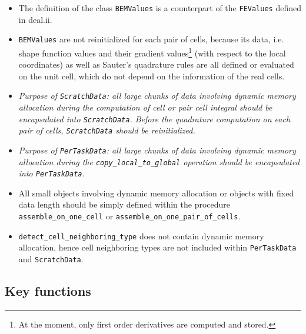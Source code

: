 \documentclass[11pt, a4paper]{article}
\begin{document}
\begin{itemize}
\item The definition of the class \texttt{BEMValues} is a counterpart of the \texttt{FEValues}
  defined in deal.ii.
\item \texttt{BEMValues} are not reinitialized for each pair of cells, because its data,
  i.e. shape function values and their gradient values\footnote{At the moment, only first
    order derivatives are computed and stored.} (with respect to the local
  coordinates) as well as Sauter's quadrature rules are all defined or evaluated on the
  unit cell, which do not depend on the information of the real cells.
\item \emph{Purpose of \texttt{ScratchData}: all large chunks of data involving dynamic memory
    allocation during the computation of cell or pair cell integral should be encapsulated into
    \texttt{ScratchData}. Before the quadrature computation on each pair of cells,
    \texttt{ScratchData} should be reinitialized.}
\item \emph{Purpose of \texttt{PerTaskData}: all large chunks of data involving dynamic memory
    allocation during the \texttt{copy\_local\_to\_global} operation should be encapsulated into
    \texttt{PerTaskData}.}
\item All small objects involving dynamic memory allocation or objects with fixed data
  length should be simply defined within the procedure \texttt{assemble\_on\_one\_cell} or
  \texttt{assemble\_on\_one\_pair\_of\_cells}.
\item \texttt{detect\_cell\_neighboring\_type} does not contain dynamic memory allocation, hence
  cell neighboring types are not included within \texttt{PerTaskData} and \texttt{ScratchData}.
\end{itemize}

\subsection{Key functions}
\end{document}
